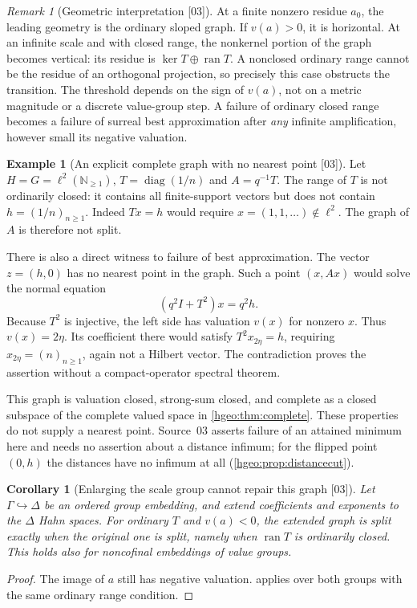 \documentclass[11pt,letterpaper]{article}
\numberwithin{equation}{section}
\newtheorem{corollary}[corollary]{Corollary}
\theoremstyle{definition}
\newtheorem{example}[example]{Example}
\theoremstyle{remark}
\newtheorem{remark}[remark]{Remark}
\newcommand{\N}{\mathbb N}
\newcommand{\ran}{\operatorname{ran}}
\newcommand{\diag}{\operatorname{diag}}
\newcommand{\src}[1]{\textup{\textsf{\small[#1]}}}
\begin{document}
\begin{remark}[Geometric interpretation \src{03}]
At a finite nonzero residue $a_0$, the leading geometry is the ordinary
sloped graph. If $v(a)>0$, it is horizontal. At an infinite scale and
with closed range, the nonkernel portion of the graph becomes vertical:
its residue is $\ker T\oplus\ran T$. A nonclosed ordinary range
cannot be the residue of an orthogonal projection, so precisely this
case obstructs the transition. The threshold depends on the sign of
$v(a)$, not on a metric magnitude or a discrete value-group step. A
failure of ordinary closed range becomes a failure of surreal best
approximation after \emph{any} infinite amplification, however small its
negative valuation.
\end{remark}

\begin{example}[An explicit complete graph with no nearest point \src{03}]
\label{hgeo:ex:badgraph}
Let $H=G=\ell^2(\N_{\ge1})$, $T=\diag(1/n)$ and $A=q^{-1}T$.
The range of $T$ is not ordinarily closed: it contains all
finite-support vectors but does not contain $h=(1/n)_{n\ge1}$.
Indeed $Tx=h$ would require $x=(1,1,\ldots)\notin\ell^2$.
The graph of $A$ is therefore not split.

There is also a direct witness to failure of best approximation.
The vector $z=(h,0)$ has no nearest point in the graph. Such a point
$(x,Ax)$ would solve the normal equation
\begin{equation}\label{hgeo:eq:badnormal}
 (q^2I+T^2)x=q^2h.
\end{equation}
Because $T^2$ is injective, the left side has valuation $v(x)$ for
nonzero $x$. Thus $v(x)=2\eta$. Its coefficient there would satisfy
$T^2x_{2\eta}=h$, requiring
$x_{2\eta}=(n)_{n\ge1}$, again not a Hilbert vector.
The contradiction proves the assertion without a compact-operator
spectral theorem.

This graph is valuation closed, strong-sum closed, and complete as a
closed subspace of the complete valued space in \cref{hgeo:thm:complete}.
These properties do not supply a nearest point. Source~03 asserts failure of
an attained minimum here and needs no assertion about a distance infimum;
for the flipped point $(0,h)$ the distances have no infimum at all
(\cref{hgeo:prop:distancecut}).
\end{example}

\begin{corollary}[Enlarging the scale group cannot repair this graph \src{03}]
\label{hgeo:cor:norepair}
Let $\Gamma\hookrightarrow\Delta$ be an ordered group embedding,
and extend coefficients and exponents to the $\Delta$ Hahn spaces.
For ordinary $T$ and $v(a)<0$, the extended graph is split exactly
when the original one is split, namely when $\ran T$ is ordinarily
closed. This holds also for noncofinal embeddings of value groups.
\end{corollary}
\begin{proof}
The image of $a$ still has negative valuation. 
applies over both groups with the same ordinary range condition.
\end{proof}
\end{document}

